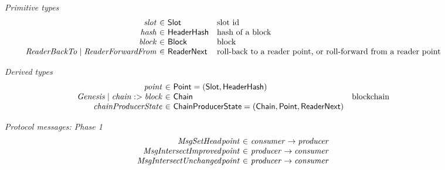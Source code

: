 \documentclass{article}
\newcommand{\var}[1]{\mathit{#1}}
\newcommand{\type}[1]{\mathsf{#1}}
\theoremstyle{definition}{
  \newtheorem{lemma}{Lemma}[section] %
  \newtheorem{definition}[lemma]{Definition}
}
\theoremstyle{theorem}{
  \newtheorem{invariant}[lemma]{Invariant}
  \newtheorem{proofobligation}[lemma]{Proof Obligation}
}
\numberwithin{equation}{lemma}
\begin{document}
\begin{figure}[H]
    \emph{Primitive types}
    \begin{equation*}
        \begin{array}{r@{~\in~}ll}
            \var{slot}                                     & \type{Slot}       & \text{slot id} \\
            \var{hash}                                     & \type{HeaderHash} & \text{hash of a block} \\
            \var{block}                                    & \type{Block}      & \text{block} \\
            \var{ReaderBackTo}\;|\;\var{ReaderForwardFrom} & \type{ReaderNext} & \text{roll-back to a reader point, or roll-forward from a reader point} \\
        \end{array}
    \end{equation*}

    \emph{Derived types}
    \begin{equation*}
        \begin{array}{r@{~\in~}ll}
            \var{point}                                  & \type{Point} = (\type{Slot}, \type{HeaderHash})                           & \\
            \var{Genesis}\;|\;\var{chain} :> \var{block} & \type{Chain}                                                              & \text{blockchain} \\
            \var{chainProducerState}                     & \type{ChainProducerState} = (\type{Chain},\type{Point},\type{ReaderNext}) & \\
        \end{array}
    \end{equation*}

    \emph{Protocol messages: Phase 1}
    \begin{equation*}
        \begin{array}{r@{~\in~}l}
            \var{MsgSetHead \var{point}}            & \var{consumer} \to \var{producer} \\
            \var{MsgIntersectImproved \var{point}}  & \var{producer} \to \var{consumer} \\
            \var{MsgIntersectUnchanged \var{point}} & \var{producer} \to \var{consumer} \\
        \end{array}
    \end{equation*}


\end{figure}
\end{document}
